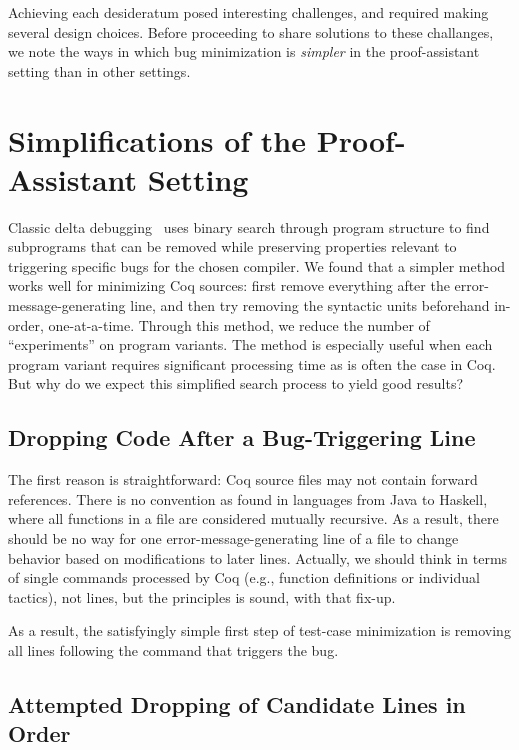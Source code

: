 \documentclass[a4paper,USenglish,cleveref,autoref,thm-restate]{lipics-v2021}
\begin{document}
Achieving each desideratum posed interesting challenges, and required making several design choices.
Before proceeding to share solutions to these challanges, we note the ways in which bug minimization is \emph{simpler} in the proof-assistant setting than in other settings.


\section{Simplifications of the Proof-Assistant Setting}\label{sec:easier}

Classic delta debugging~\cite{Zeller2002} uses binary search through program structure to find subprograms that can be removed while preserving properties relevant to triggering specific bugs for the chosen compiler.
We found that a simpler method works well for minimizing Coq sources: first remove everything after the error-message-generating line, and then try removing the syntactic units beforehand in-order, one-at-a-time.
Through this method, we reduce the number of ``experiments'' on program variants.
The method is especially useful when each program variant requires significant processing time as is often the case in Coq.
But why do we expect this simplified search process to yield good results?

\subsection{Dropping Code After a Bug-Triggering Line}

The first reason is straightforward: Coq source files may not contain forward references.
There is no convention as found in languages from Java to Haskell, where all functions in a file are considered mutually recursive.
As a result, there should be no way for one error-message-generating line of a file to change behavior based on modifications to later lines.
Actually, we should think in terms of single commands processed by Coq (e.g., function definitions or individual tactics), not lines, but the principles is sound, with that fix-up.

As a result, the satisfyingly simple first step of test-case minimization is removing all lines following the command that triggers the bug.

\subsection{Attempted Dropping of Candidate Lines in Order}
\end{document}
